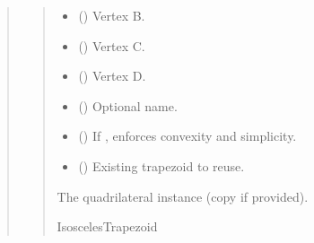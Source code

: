 \documentclass[letterpaper,10pt,english]{sphinxmanual}
\begin{document}
\begin{quote}
\begin{fulllineitems}
\begin{fulllineitems}
\begin{quote}
\begin{description}
\begin{itemize}
\item {} 
\sphinxAtStartPar
{} (\sphinxstyleliteralemphasis{\sphinxupquote{ | }}) \textendash{} Vertex B.

\item {} 
\sphinxAtStartPar
{} (\sphinxstyleliteralemphasis{\sphinxupquote{ | }}) \textendash{} Vertex C.

\item {} 
\sphinxAtStartPar
{} (\sphinxstyleliteralemphasis{\sphinxupquote{ | }}) \textendash{} Vertex D.

\item {} 
\sphinxAtStartPar
{} (\sphinxstyleliteralemphasis{\sphinxupquote{ | }}) \textendash{} Optional name.

\item {} 
\sphinxAtStartPar
{} () \textendash{} If , enforces convexity and simplicity.

\item {} 
\sphinxAtStartPar
{} (\sphinxstyleliteralemphasis{\sphinxupquote{ | }}) \textendash{} Existing trapezoid to reuse.

\end{itemize}

\sphinxAtStartPar
The quadrilateral instance (copy if provided).

\sphinxAtStartPar
IsoscelesTrapezoid

\end{description}\end{quote}

\end{fulllineitems}



\end{fulllineitems}
\end{quote}
\end{document}
